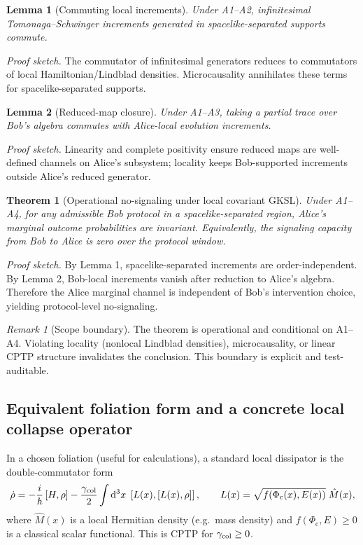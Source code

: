 \documentclass[reprint,amsmath,amssymb,aps,showkeys]{revtex4-2}
\newtheorem{lemma}{Lemma}
\newtheorem{theorem}{Theorem}
\theoremstyle{remark}
\newtheorem{remark}{Remark}
\newcommand{\dd}{\mathrm{d}}
\newcommand{\Comm}[2]{\left[#1,#2\right]}
\newcommand{\Phic}{\Phi_{\mathrm{c}}}
\newcommand{\Eth}{E}
\begin{document}
\begin{lemma}[Commuting local increments]
Under A1--A2, infinitesimal Tomonaga--Schwinger increments generated in spacelike-separated supports commute.
\end{lemma}

\textit{Proof sketch.}
The commutator of infinitesimal generators reduces to commutators of local Hamiltonian/Lindblad densities.
Microcausality annihilates these terms for spacelike-separated supports.

\begin{lemma}[Reduced-map closure]
Under A1--A3, taking a partial trace over Bob's algebra commutes with Alice-local evolution increments.
\end{lemma}

\textit{Proof sketch.}
Linearity and complete positivity ensure reduced maps are well-defined channels on Alice's subsystem; locality keeps Bob-supported increments outside Alice's reduced generator.

\begin{theorem}[Operational no-signaling under local covariant GKSL]
\label{thm:nosignaling_v2}
Under A1--A4, for any admissible Bob protocol in a spacelike-separated region, Alice's marginal outcome probabilities are invariant. Equivalently, the signaling capacity from Bob to Alice is zero over the protocol window.
\end{theorem}

\textit{Proof sketch.}
By Lemma 1, spacelike-separated increments are order-independent. By Lemma 2, Bob-local increments vanish after reduction to Alice's algebra. Therefore the Alice marginal channel is independent of Bob's intervention choice, yielding protocol-level no-signaling.

\begin{remark}[Scope boundary]
The theorem is operational and conditional on A1--A4. Violating locality (nonlocal Lindblad densities), microcausality, or linear CPTP structure invalidates the conclusion. This boundary is explicit and test-auditable.
\end{remark}

\subsection{Equivalent foliation form and a concrete local collapse operator}
In a chosen foliation (useful for calculations), a standard local dissipator is the double-commutator form
\begin{equation}
\dot{\rho}
=
-\frac{i}{\hbar}\Comm{H}{\rho}
-\frac{\gamma_{\rm col}}{2}
\int \dd^3x\;\Comm{L(x)}{\Comm{L(x)}{\rho}},
\qquad
L(x)=\sqrt{f(\Phic(x),\Eth(x))}\;\hat{M}(x),
\label{eq:double_comm}
\end{equation}
where $\hat{M}(x)$ is a local Hermitian density (e.g.\ mass density) and $f(\Phic,\Eth)\ge 0$
is a classical scalar functional. This is CPTP for $\gamma_{\rm col}\ge 0$.
\end{document}

